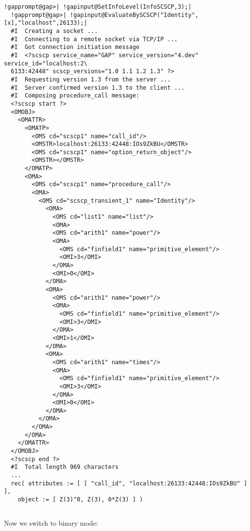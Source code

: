 \documentclass[a4paper,11pt]{report}
\begin{document}
{{\begin{Verbatim}[commandchars=!@|,fontsize=\small,frame=single,label=Example]
  !gapprompt@gap>| !gapinput@SetInfoLevel(InfoSCSCP,3);|
  !gapprompt@gap>| !gapinput@EvaluateBySCSCP("Identity",[x],"localhost",26133);|
  #I  Creating a socket ...
  #I  Connecting to a remote socket via TCP/IP ...
  #I  Got connection initiation message
  #I  <?scscp service_name="GAP" service_version="4.dev" service_id="localhost:2\
  6133:42448" scscp_versions="1.0 1.1 1.2 1.3" ?>
  #I  Requesting version 1.3 from the server ...
  #I  Server confirmed version 1.3 to the client ...
  #I  Composing procedure_call message: 
  <?scscp start ?>
  <OMOBJ>
    <OMATTR>
      <OMATP>
        <OMS cd="scscp1" name="call_id"/>
        <OMSTR>localhost:26133:42448:IOs9ZkBU</OMSTR>
        <OMS cd="scscp1" name="option_return_object"/>
        <OMSTR></OMSTR>
      </OMATP>
      <OMA>
        <OMS cd="scscp1" name="procedure_call"/>
        <OMA>
          <OMS cd="scscp_transient_1" name="Identity"/>
            <OMA>
              <OMS cd="list1" name="list"/>
              <OMA>
              <OMS cd="arith1" name="power"/>
              <OMA>
                <OMS cd="finfield1" name="primitive_element"/>
                <OMI>3</OMI>
              </OMA>
              <OMI>0</OMI>
            </OMA>
            <OMA>
              <OMS cd="arith1" name="power"/>
              <OMA>
                <OMS cd="finfield1" name="primitive_element"/>
                <OMI>3</OMI>
              </OMA>
              <OMI>1</OMI>
            </OMA>
            <OMA>
              <OMS cd="arith1" name="times"/>
              <OMA>
                <OMS cd="finfield1" name="primitive_element"/>
                <OMI>3</OMI>
              </OMA>
              <OMI>0</OMI>
            </OMA>
          </OMA>
        </OMA>
      </OMA>
    </OMATTR>
  </OMOBJ>
  <?scscp end ?>
  #I  Total length 969 characters 
  ...
  rec( attributes := [ [ "call_id", "localhost:26133:42448:IOs9ZkBU" ] ], 
    object := [ Z(3)^0, Z(3), 0*Z(3) ] )
    
\end{Verbatim}
 Now we switch to binary mode: 
\begin{Verbatim}[commandchars=!@|,fontsize=\small,frame=single,label=Example]
  

\end{Verbatim}}}
\end{document}
